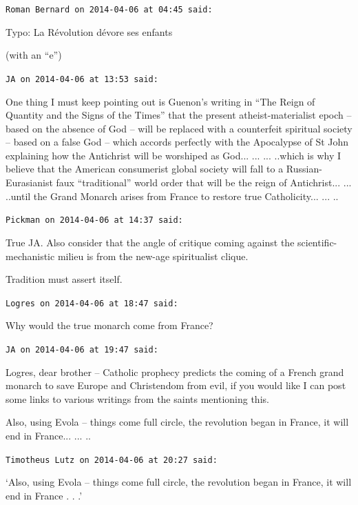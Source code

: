 \begin{footnotesize}
\begin{sffamily}
\texttt{Roman Bernard on 2014-04-06 at 04:45 said:}

Typo: La Révolution dévore ses enfants

(with an ``e'')

\hfill

\texttt{JA on 2014-04-06 at 13:53 said:}

One thing I must keep pointing out is Guenon's writing in ``The Reign of Quantity and the Signs of the Times'' that the present atheist-materialist epoch -- based on the absence of God -- will be replaced with a counterfeit spiritual society -- based on a false God -- which accords perfectly with the Apocalypse of St John explaining how the Antichrist will be worshiped as God... ... ... ..which is why I believe that the American consumerist global society will fall to a Russian-Eurasianist faux ``traditional'' world order that will be the reign of Antichrist... ... ..until the Grand Monarch arises from France to restore true Catholicity... ... ..

\hfill

\texttt{Pickman on 2014-04-06 at 14:37 said:}

True JA. Also consider that the angle of critique coming against the scientific-mechanistic milieu is from the new-age spiritualist clique.

Tradition must assert itself.

\hfill

\texttt{Logres on 2014-04-06 at 18:47 said:}

Why would the true monarch come from France?

\hfill

\texttt{JA on 2014-04-06 at 19:47 said:}

Logres, dear brother -- Catholic prophecy predicts the coming of a French grand monarch to save Europe and Christendom from evil, if you would like I can post some links to various writings from the saints mentioning this.

Also, using Evola -- things come full circle, the revolution began in France, it will end in France... ... ..

\hfill

\texttt{Timotheus Lutz on 2014-04-06 at 20:27 said:}

`Also, using Evola -- things come full circle, the revolution began in France, it will end in France . . .'


\end{sffamily}
\end{footnotesize}
